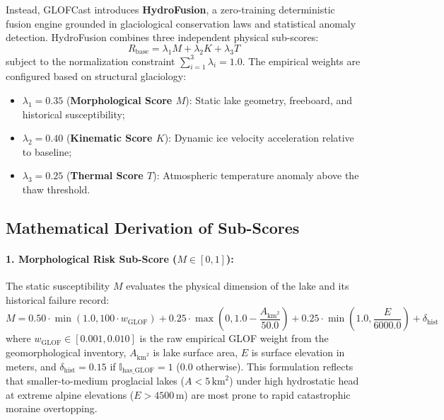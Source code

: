 \documentclass{mnnit}
\begin{document}
Instead, GLOFCast introduces \textbf{HydroFusion}, a zero-training deterministic fusion engine grounded in glaciological conservation laws and statistical anomaly detection. HydroFusion combines three independent physical sub-scores:
\begin{equation}
    R_{\text{base}} = \lambda_1 M + \lambda_2 K + \lambda_3 T
    \label{eq:hydrofusion_base}
\end{equation}
subject to the normalization constraint $\sum_{i=1}^3 \lambda_i = 1.0$. The empirical weights are configured based on structural glaciology:
\begin{itemize}
    \item $\lambda_1 = 0.35$ (\textbf{Morphological Score $M$}): Static lake geometry, freeboard, and historical susceptibility;
    \item $\lambda_2 = 0.40$ (\textbf{Kinematic Score $K$}): Dynamic ice velocity acceleration relative to baseline;
    \item $\lambda_3 = 0.25$ (\textbf{Thermal Score $T$}): Atmospheric temperature anomaly above the thaw threshold.
\end{itemize}

\subsection{Mathematical Derivation of Sub-Scores}

\paragraph{1. Morphological Risk Sub-Score ($M \in [0, 1]$):}
The static susceptibility $M$ evaluates the physical dimension of the lake and its historical failure record:
\begin{equation}
    M = 0.50 \cdot \min\left(1.0, 100 \cdot w_{\text{GLOF}}\right) + 0.25 \cdot \max\left(0, 1.0 - \frac{A_{\text{km}^2}}{50.0}\right) + 0.25 \cdot \min\left(1.0, \frac{E}{6000.0}\right) + \delta_{\text{hist}}
    \label{eq:morph_score}
\end{equation}
where $w_{\text{GLOF}} \in [0.001, 0.010]$ is the raw empirical GLOF weight from the geomorphological inventory, $A_{\text{km}^2}$ is lake surface area, $E$ is surface elevation in meters, and $\delta_{\text{hist}} = 0.15$ if $\mathbb{I}_{\text{has\_GLOF}} = 1$ (0.0 otherwise). This formulation reflects that smaller-to-medium proglacial lakes ($A < 5\,\text{km}^2$) under high hydrostatic head at extreme alpine elevations ($E > 4500\,\text{m}$) are most prone to rapid catastrophic moraine overtopping.
\end{document}
